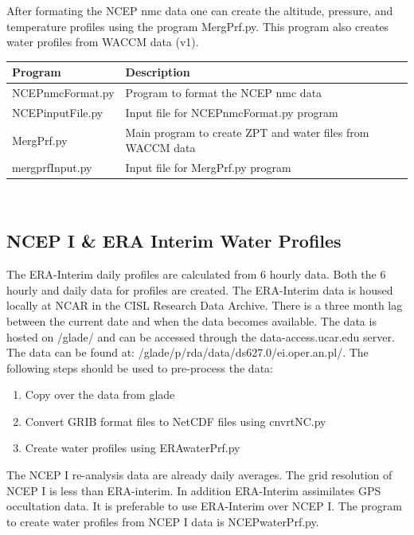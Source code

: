\documentclass[12pt, letterpaper]{article}
\begin{document}
After formating the NCEP nmc data one can create the altitude, pressure, and temperature profiles using the program MergPrf.py. This program also creates water profiles from WACCM data (v1).\\

\begin{tabular}{ l l }
\textbf{Program} & \textbf{Description} \\
\hline
NCEPnmcFormat.py & Program to format the NCEP nmc data\\
NCEPinputFile.py & Input file for NCEPnmcFormat.py program \\
MergPrf.py       & Main program to create ZPT and water files from WACCM data\\
mergprfInput.py  & Input file for MergPrf.py program \\
\end{tabular} \\

\subsection{NCEP I \& ERA Interim Water Profiles}
\label{sec:ERAInt}
The ERA-Interim daily profiles are calculated from 6 hourly data. Both the 6 hourly and daily data for profiles are created. The ERA-Interim data is housed locally at NCAR in the CISL Research Data Archive. There is a three month lag between the current date and when the data becomes available. The data is hosted on /glade/ and can be accessed through the data-access.ucar.edu server. The data can be found at: /glade/p/rda/data/ds627.0/ei.oper.an.pl/. The following steps should be used to pre-process the data:\\

\begin{enumerate}
\item Copy over the data from glade
\item Convert GRIB format files to NetCDF files using cnvrtNC.py
\item Create water profiles using ERAwaterPrf.py
\end{enumerate}

The NCEP I re-analysis data are already daily averages. The grid resolution of NCEP I is less than ERA-interim. In addition ERA-Interim assimilates GPS occultation data. It is preferable to use ERA-Interim over NCEP I. The program to create water profiles from NCEP I data is NCEPwaterPrf.py.\\
\end{document}
